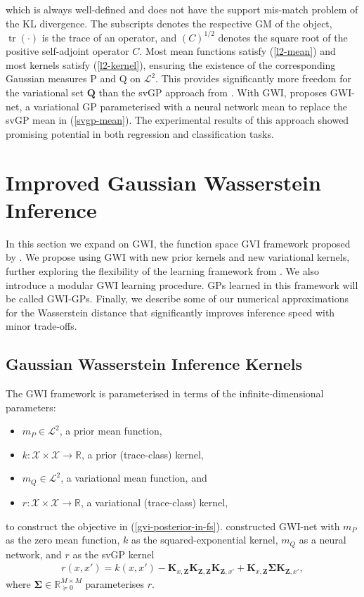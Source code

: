 \documentclass{article}
\newcommand{\tr}{\operatorname{tr}}
\numberwithin{equation}{section}
\begin{document}
which is always well-defined and does not have the support mis-match problem of the KL divergence.
The subscripts denotes the respective GM of the object, $\tr(\cdot)$ is the trace of an operator, and $(C)^{1/2}$ denotes the square root of the positive self-adjoint operator $C$.
Most mean functions satisfy (\ref{l2-mean}) and most kernels satisfy (\ref{l2-kernel}), ensuring the existence of the corresponding Gaussian measures P and Q on $\mathcal{L}^2$.
This provides significantly more freedom for the variational set $\boldsymbol{Q}$ than the svGP approach from \cite{titsias2009variational}.
With GWI, \cite{wild2022generalized} proposes GWI-net, a variational GP parameterised with a neural network mean to replace the svGP mean in (\ref{svgp-mean}).
The experimental results of this approach showed promising potential in both regression and classification tasks.

\newpage

\section{Improved Gaussian Wasserstein Inference}
In this section we expand on GWI, the function space GVI framework proposed by \cite{wild2022generalized}.
We propose using GWI with new prior kernels and new variational kernels, further exploring the flexibility of the learning framework from \cite{wild2022generalized}.
We also introduce a modular GWI learning procedure.
GPs learned in this framework will be called GWI-GPs.
Finally, we describe some of our numerical approximations for the Wasserstein distance that significantly improves inference speed with minor trade-offs.

\subsection{Gaussian Wasserstein Inference Kernels}
The GWI framework is parameterised in terms of the infinite-dimensional parameters:
\begin{itemize}
    \item $m_P \in \mathcal{L}^2$, a prior mean function,
    \item $k: \mathcal{X} \times \mathcal{X} \rightarrow \mathbb{R}$, a prior (trace-class) kernel,
    \item $m_Q \in \mathcal{L}^2$, a variational mean function, and
    \item $r: \mathcal{X} \times \mathcal{X} \rightarrow \mathbb{R}$, a variational (trace-class) kernel,
\end{itemize}
to construct the objective in (\ref{gvi-posterior-in-fs}). \cite{wild2022generalized} constructed GWI-net with $m_P$ as the zero mean function, $k$ as the squared-exponential kernel, $m_Q$ as a neural network, and $r$ as the svGP kernel
\begin{align}
    r(x, x') = k(x, x') - \mathbf{K}_{x, \mathbf{Z}} \mathbf{K}_{\mathbf{Z}, \mathbf{Z}} \mathbf{K}_{\mathbf{Z}, x'} + \mathbf{K}_{x, \mathbf{Z}} \mathbf{\Sigma} \mathbf{K}_{\mathbf{Z}, x'},
    \label{gwi-svgp-kernel}
\end{align}
where $\mathbf{\Sigma} \in \mathbb{R}^{M \times M}_{\succcurlyeq 0}$ parameterises $r$.
\end{document}
